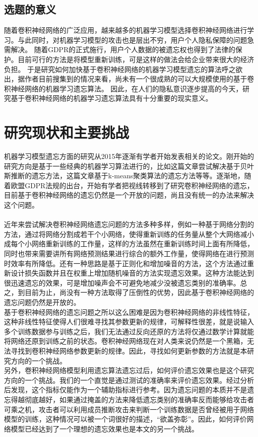 \subsection{选题的意义}
随着卷积神经网络的广泛应用，越来越多的机器学习模型选择卷积神经网络进行学习。与此同时，对机器学习模型的攻击也是层出不穷，用户个人隐私保障的问题急需解决。
随着GDPR的正式施行，用户个人数据的被遗忘权也得到了法律的保护。目前可行的方法是将模型重新训练，可是这样的做法会给企业带来很大的经济负担。
于是研究如何加快基于卷积神经网络的机器学习模型遗忘的算法呼之欲出，据作者目前搜集到的情况来看，尚未有一个很成熟的可以大规模使用的基于卷积神经网络的机器学习遗忘算法。
因此，在人们的隐私意识逐步提高的今天，研究基于卷积神经网络的机器学习遗忘算法具有十分重要的现实意义。
\section{研究现状和主要挑战}
机器学习模型遗忘方面的研究从2015年逐渐有学者开始发表相关的论文。刚开始的研究方向是基于一些经典的机器学习算法进行的，比如这篇文章尝试解决基于贝叶斯推断的遗忘方法，这篇文章基于k-means聚类算法的遗忘方法等等。逐渐地，随着欧盟GDPR法规的出台，开始有学者把视线转移到了研究卷积神经网络的遗忘，目前基于卷积神经网络的遗忘仍然是一个开放的问题，尚且没有统一的办法来解决这个问题。
\paragraph{}近年来尝试解决卷积神经网络遗忘问题的方法多种多样，例如一种基于网络分割的方法，通过将网络分割成若干个小网络，使得重新训练的任务量从整个大网络减小成每个小网络重新训练的工作量，这样的方法虽然在重新训练时间上面有所降低，同时也带来需要讲所有网络预测结果进行综合的额外工作量，使得网络在进行预测时效率有所降低。还有一种思路是基于正则化和增加噪音的方法，这个方法通过重新设计损失函数并且在权重上增加随机噪音的方法实现遗忘效果。这种方法能达到很迅速遗忘的效果，可是增加噪声会不可避免地减少没被遗忘类别的准确率。总之，到目前为止，尚没有一种方法取得了压倒性的优势，因此基于卷积神经网络的遗忘问题仍然是开放的。
\\基于卷积神经网络的遗忘问题之所以这么困难是因为卷积神经网络的非线性特征，这种非线性特征使得人们很难寻找其参数更新的规律，可解释性很差，就是说输入多个训练数据参与训练之后，我们无法通过反向还原的方法将仅通过数学计算就能将网络还原到训练之前的状态。卷积神经网络现在对人类来说仍然是一个黑箱，无法寻找到卷积神经网络参数更新的规律。因此，寻找如何更新参数的方法就是本研究方向的一个挑战。
\\另外，卷积神经网络模型利用遗忘算法遗忘过后，如何评价遗忘效果也是这个研究方向的一个挑战。我们的一个直觉是通过测试的准确率来评价遗忘效果。经过分析后发现，这个指标仅能作为一个辅助指标进行参考。因为遗忘问题的本质并不是遗忘得越彻底越好，如果通过掩盖的方法来降低遗忘类别的准确率反而能够给攻击者可乘之机，攻击者可以利用成员推断攻击来判断一个训练数据是否曾经被用于网络模型的训练，这种情况可以被一个词很好的描述，“欲盖弥彰”。因此，如何评价网络模型已经达到了一个理想的遗忘效果也是本文的另一个挑战。
